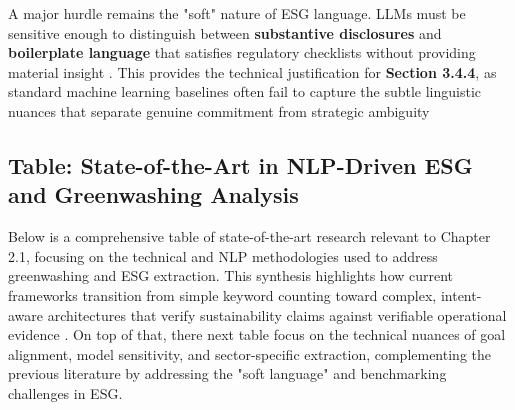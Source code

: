 A major hurdle remains the "soft" nature of ESG language. LLMs must be sensitive enough to distinguish between \textbf{substantive disclosures} and \textbf{boilerplate language} that satisfies regulatory checklists without providing material insight  \parencite{frederik_maibaum_b8629037}. This provides the technical justification for \textbf{Section 3.4.4}, as standard machine learning baselines often fail to capture the subtle linguistic nuances that separate genuine commitment from strategic ambiguity  \parencite[]{marco_bronzini_bf94d949, arash_hajikhani_cbb2528f}
\subsection{Table: State-of-the-Art in NLP-Driven ESG and Greenwashing Analysis}

Below is a comprehensive table of state-of-the-art research relevant to Chapter 2.1, focusing on the technical and NLP methodologies used to address greenwashing and ESG extraction. This synthesis highlights how current frameworks transition from simple keyword counting toward complex, intent-aware architectures that verify sustainability claims against verifiable operational evidence  \parencite{keane_ong_0a5de439}. On top of that, there next table focus on the technical nuances of goal alignment, model sensitivity, and sector-specific extraction, complementing the previous literature by addressing the "soft language" and benchmarking challenges in ESG.



